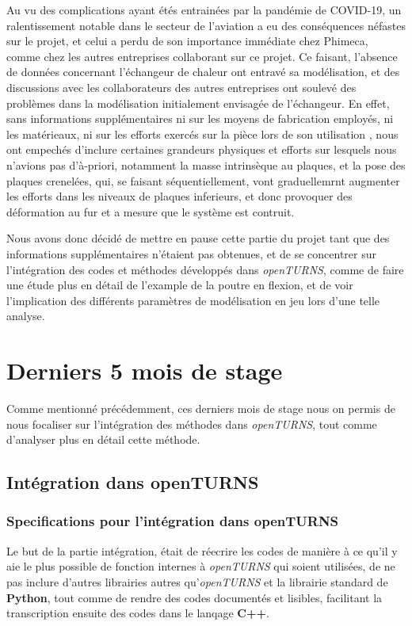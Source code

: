 \documentclass[a4paper,10pt]{article}
\begin{document}
Au vu des complications ayant étés entrainées par la pandémie de COVID-19, un ralentissement notable dans le secteur de l'aviation a eu des conséquences néfastes sur le projet, et celui a perdu de son importance immédiate chez Phimeca, comme chez les autres entreprises collaborant sur ce projet. 
Ce faisant, l'absence de données concernant l'échangeur de chaleur ont entravé sa modélisation, et des discussions avec les collaborateurs des autres entreprises ont soulevé des problèmes dans la modélisation initialement envisagée de l'échangeur. En effet, sans informations supplémentaires ni sur les moyens de fabrication employés, ni les matérieaux, ni sur les efforts exercés sur la pièce lors de son utilisation , nous ont empechés d'inclure certaines grandeurs physiques et efforts sur lesquels nous n'avions pas d'à-priori, notamment la masse intrinsèque au plaques, et la pose des plaques crenelées, qui, se faisant séquentiellement, vont graduellemrnt augmenter les efforts dans les niveaux de plaques inferieurs, et donc provoquer des déformation au fur et a mesure que le système est contruit. 

Nous avons donc décidé de mettre en pause cette partie du projet tant que des informations supplémentaires n'étaient pas obtenues, et de se concentrer sur l'intégration des codes et méthodes développés dans \textit{openTURNS}, comme de faire une étude plus en détail de l'example de la poutre en flexion, et de voir l'implication des différents paramètres de modélisation en jeu lors d'une telle analyse. 

\section{Derniers 5 mois de stage }
Comme mentionné précédemment, ces derniers mois de stage nous on permis de nous focaliser sur l'intégration des méthodes dans \textit{openTURNS}, tout comme d'analyser plus en détail cette méthode.

\subsection{Intégration dans openTURNS}
\subsubsection{Specifications pour l'intégration dans openTURNS}
Le but de la partie intégration, était de réecrire les codes de manière à ce qu'il y aie le plus possible de fonction internes à \textit{openTURNS} qui soient utilisées, de ne pas inclure d'autres librairies autres qu'\textit{openTURNS} et la librairie standard de \textbf{Python}, tout comme de rendre des codes documentés et lisibles, facilitant la transcription ensuite des codes dans le lanqage \textbf{C++}.
\end{document}
